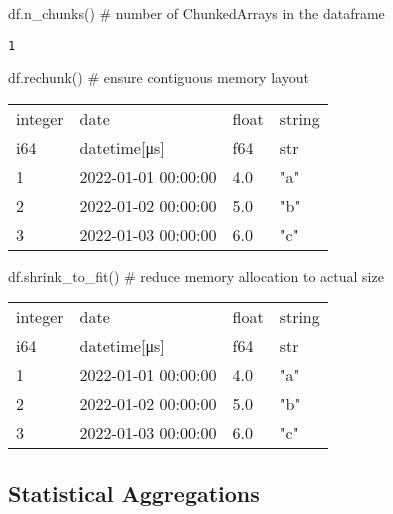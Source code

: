 \documentclass[
  letterpaper,
  DIV=11,
  numbers=noendperiod]{scrartcl}
\newenvironment{Shaded}{\begin{snugshade}}{\end{snugshade}}
\newcommand{\CommentTok}[1]{\textcolor[rgb]{0.37,0.37,0.37}{#1}}
\newcommand{\NormalTok}[1]{\textcolor[rgb]{0.00,0.23,0.31}{#1}}
\begin{document}
\begin{Shaded}
\begin{Highlighting}[]
\NormalTok{df.n\_chunks() }\CommentTok{\# number of ChunkedArrays in the dataframe}
\end{Highlighting}
\end{Shaded}

\begin{verbatim}
1
\end{verbatim}

\begin{Shaded}
\begin{Highlighting}[]
\NormalTok{df.rechunk() }\CommentTok{\# ensure contiguous memory layout}
\end{Highlighting}
\end{Shaded}

\begin{longtable}[]{@{}llll@{}}
\toprule()
integer & date & float & string \\
i64 & datetime{[}μs{]} & f64 & str \\
\midrule()
\endhead
1 & 2022-01-01 00:00:00 & 4.0 & "a" \\
2 & 2022-01-02 00:00:00 & 5.0 & "b" \\
3 & 2022-01-03 00:00:00 & 6.0 & "c" \\
\bottomrule()
\end{longtable}

\begin{Shaded}
\begin{Highlighting}[]
\NormalTok{df.shrink\_to\_fit() }\CommentTok{\# reduce memory allocation to actual size}
\end{Highlighting}
\end{Shaded}

\begin{longtable}[]{@{}llll@{}}
\toprule()
integer & date & float & string \\
i64 & datetime{[}μs{]} & f64 & str \\
\midrule()
\endhead
1 & 2022-01-01 00:00:00 & 4.0 & "a" \\
2 & 2022-01-02 00:00:00 & 5.0 & "b" \\
3 & 2022-01-03 00:00:00 & 6.0 & "c" \\
\bottomrule()
\end{longtable}

\hypertarget{statistical-aggregations}{%
\subsection{Statistical Aggregations}\label{statistical-aggregations}}
\end{document}
